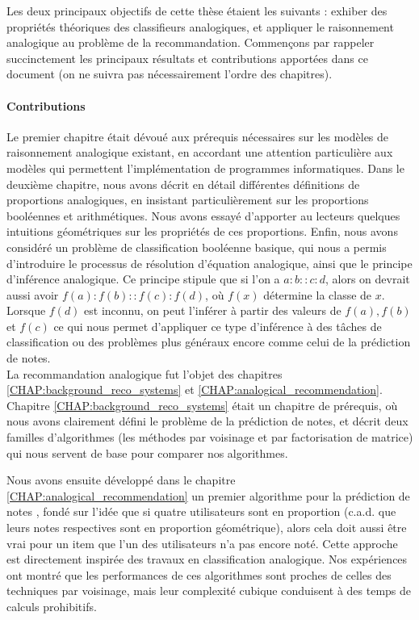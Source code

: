 Les deux principaux objectifs de cette thèse étaient les suivants : exhiber des
propriétés théoriques des classifieurs analogiques, et appliquer le
raisonnement analogique au problème de la recommandation. Commençons par
rappeler succinctement les principaux résultats et contributions apportées dans
ce document (on ne suivra pas nécessairement l'ordre des chapitres).

\paragraph{Contributions\\}

Le premier chapitre était dévoué aux prérequis nécessaires sur les modèles de
raisonnement analogique existant, en accordant une attention particulière aux
modèles qui permettent l'implémentation de programmes informatiques. Dans le
deuxième chapitre, nous avons décrit en détail différentes définitions de
proportions analogiques, en insistant particulièrement sur les proportions
booléennes et arithmétiques. Nous avons essayé d'apporter au lecteurs quelques
intuitions géométriques sur les propriétés de ces proportions. Enfin, nous
avons considéré un problème de classification booléenne basique, qui nous a
permis d'introduire le processus de résolution d'équation analogique, ainsi que
le principe d'inférence analogique. Ce principe stipule que si l'on a
$a:b::c:d$, alors on devrait aussi avoir $f(a):f(b)::f(c):f(d)$, où $f(x)$
détermine la classe de $x$. Lorsque $f(d)$ est inconnu, on peut l'inférer à
partir des valeurs de $f(a), f(b)$ et $f(c)$ ce qui nous permet d'appliquer ce
type d'inférence à des tâches de classification ou des problèmes plus généraux
encore comme celui de la prédiction de notes.\\

La recommandation analogique fut l'objet des chapitres
\ref{CHAP:background_reco_systems} et \ref{CHAP:analogical_recommendation}.
Chapitre \ref{CHAP:background_reco_systems} était un chapitre de prérequis, où
nous avons clairement défini le problème de la prédiction de notes, et décrit
deux familles d'algorithmes (les méthodes par voisinage et par factorisation de
matrice) qui nous servent de base pour comparer nos algorithmes.

Nous avons ensuite développé dans le chapitre
\ref{CHAP:analogical_recommendation} un premier algorithme pour la prédiction
de notes  \cite{HugPraRicISMIS15}, fondé sur l'idée que si quatre utilisateurs
sont en proportion (c.a.d. que leurs notes respectives sont en proportion
géométrique), alors cela doit aussi être vrai pour un item que l'un des
utilisateurs n'a pas encore noté. Cette approche est directement inspirée des
travaux en classification analogique. Nos expériences ont montré que les
performances de ces algorithmes sont proches de celles des techniques par
voisinage, mais leur complexité cubique conduisent à des temps de calculs
prohibitifs.


